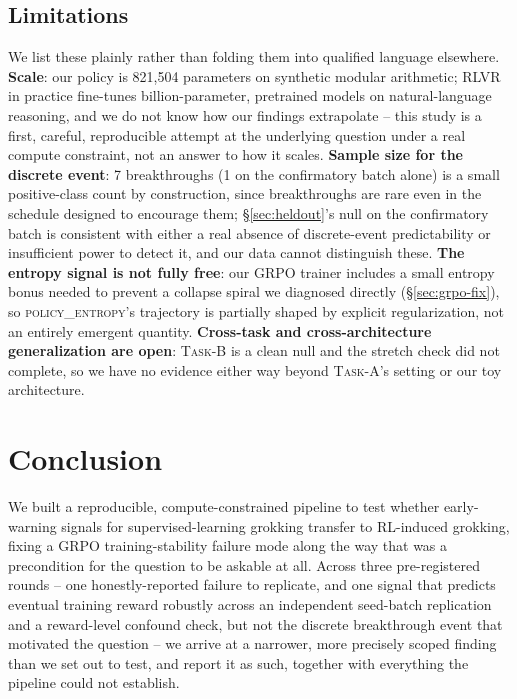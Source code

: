 \documentclass{article}
\newcommand{\taskA}{\textsc{Task-A}}
\newcommand{\taskB}{\textsc{Task-B}}
\newcommand{\pentropy}{\textsc{policy\_entropy}}
\begin{document}
\subsection{Limitations}
\label{sec:limitations}

We list these plainly rather than folding them into qualified language
elsewhere. \textbf{Scale}: our policy is 821,504 parameters on synthetic
modular arithmetic; RLVR in practice fine-tunes billion-parameter, pretrained
models on natural-language reasoning, and we do not know how our findings
extrapolate -- this study is a first, careful, reproducible attempt at the
underlying question under a real compute constraint, not an answer to how it
scales. \textbf{Sample size for
the discrete event}: 7 breakthroughs (1 on the confirmatory batch alone) is a
small positive-class count by construction, since breakthroughs are rare even
in the schedule designed to encourage them; \S\ref{sec:heldout}'s null on the
confirmatory batch is consistent with either a real absence of discrete-event
predictability or insufficient power to detect it, and our data cannot
distinguish these. \textbf{The entropy signal is not fully free}: our GRPO
trainer includes a small entropy bonus needed to prevent a collapse spiral we
diagnosed directly (\S\ref{sec:grpo-fix}), so \pentropy{}'s trajectory is
partially shaped by explicit regularization, not an entirely emergent
quantity. \textbf{Cross-task and cross-architecture generalization are open}:
\taskB{} is a clean null and the stretch check did not complete, so we have no
evidence either way beyond \taskA{}'s setting or our toy architecture.

\section{Conclusion}
\label{sec:conclusion}

We built a reproducible, compute-constrained pipeline to test whether
early-warning signals for supervised-learning grokking transfer to
RL-induced grokking, fixing a GRPO training-stability failure mode along the
way that was a precondition for the question to be askable at all. Across
three pre-registered rounds -- one honestly-reported failure to replicate,
and one signal that predicts eventual training reward robustly across an
independent seed-batch replication and a reward-level confound check, but not
the discrete breakthrough event that motivated the question -- we arrive at a
narrower, more precisely scoped finding than we set out to test, and report it
as such, together with everything the pipeline could not establish.
\end{document}
